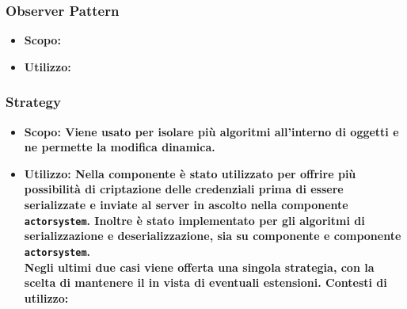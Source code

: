\documentclass{scalatekids-article}
\begin{document}
\subsubsection{Observer Pattern}

\label{sec:ObserverPattern}

\begin{itemize}
\item \bf{Scopo:}
\item \bf{Utilizzo:}
\end{itemize}

\subsubsection{Strategy}

\begin{itemize}
\item \bf{Scopo:} Viene usato per isolare più algoritmi all'interno di oggetti e
  ne permette la modifica dinamica.
\item \bf{Utilizzo:} Nella componente  è stato utilizzato per
  offrire più possibilità di criptazione delle credenziali prima di essere
  serializzate e inviate al server in ascolto nella componente
  \verb=actorsystem=. Inoltre è stato implementato per gli algoritmi di serializzazione
  e deserializzazione, sia su componente  e componente \verb=actorsystem=.\\
  Negli ultimi due casi viene offerta una singola strategia, con la scelta di mantenere
  il  in vista di eventuali estensioni.
  Contesti di utilizzo:
  \begin{itemize}


\end{itemize}
\end{itemize}
\end{document}
